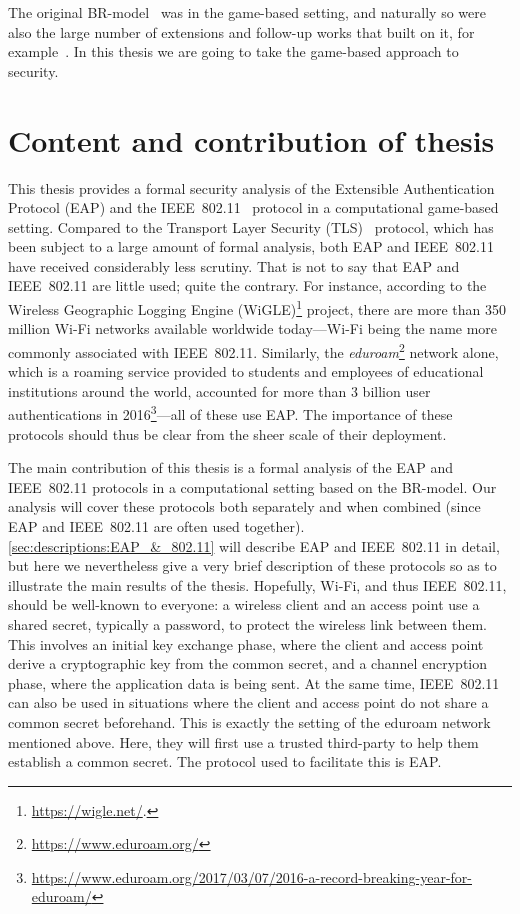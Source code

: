 The original BR-model~\cite{C:BelRog93} was in the game-based setting,
and naturally so were also the large number of extensions and follow-up works that built on it,
for example~\cite{STOC:BelRog95,Blake-WilsonM:1997:BR93_asymmetric,EC:BelPoiRog00,EC:CanKra01,PROVSEC:LaMLauMit07,C:JKSS12}.
In this thesis we are going to take the game-based approach to security.



\section{Content and contribution of thesis}


This thesis provides a formal security analysis of the Extensible Authentication Protocol (EAP) \cite{IETF:RFC3748:EAP} and the IEEE~802.11~\cite{IEEE:2012:802.11} protocol in a computational game-based setting.
Compared to the Transport Layer Security (TLS)~\cite{IETF:RFC5246:TLS} protocol,
which has been subject to a large amount of formal analysis,
both EAP and IEEE~802.11 have received considerably less scrutiny. 
That is not to say that EAP and IEEE~802.11 are little used;
quite the contrary.
For instance,
according to the Wireless Geographic Logging Engine (WiGLE)\footnote{\url{https://wigle.net/}.
} project,
there are more than 350 million Wi-Fi networks available worldwide today---Wi-Fi being the name more commonly associated with IEEE~802.11.
Similarly,
the \emph{eduroam}\footnote{\url{https://www.eduroam.org/}} network alone,
which is a roaming service provided to students and employees of educational institutions around the world,
accounted for more than 3 billion user authentications in 2016\footnote{\url{https://www.eduroam.org/2017/03/07/2016-a-record-breaking-year-for-eduroam/}
}---all of these use EAP.
The importance of these protocols should thus be clear from the sheer scale of their deployment.
  
The main contribution of this thesis is a formal analysis of the EAP and IEEE~802.11 protocols in a computational setting based on the BR-model.
Our analysis will cover these protocols both separately and when combined 
(since EAP and IEEE~802.11 are often used together). 
\cref{sec:descriptions:EAP_&_802.11} will describe EAP and IEEE~802.11 in detail,
but here we nevertheless give a very brief description of these protocols so as to illustrate the main results of the thesis.
Hopefully,
Wi-Fi,
and thus IEEE~802.11,
should be well-known to everyone:
a wireless client and an access point use a shared secret,
typically a password,
to protect the wireless link between them. 
This involves an initial key exchange phase,
where the client and access point derive a cryptographic key from the common secret,
and a channel encryption phase,
where the application data is being sent.
At the same time,
IEEE~802.11 can also be used in situations where the client and access point do not share a common secret beforehand.
This is exactly the setting of the eduroam network mentioned above.
Here,
they will first use a trusted third-party to help them establish a common secret.
The protocol used to facilitate this is EAP.

